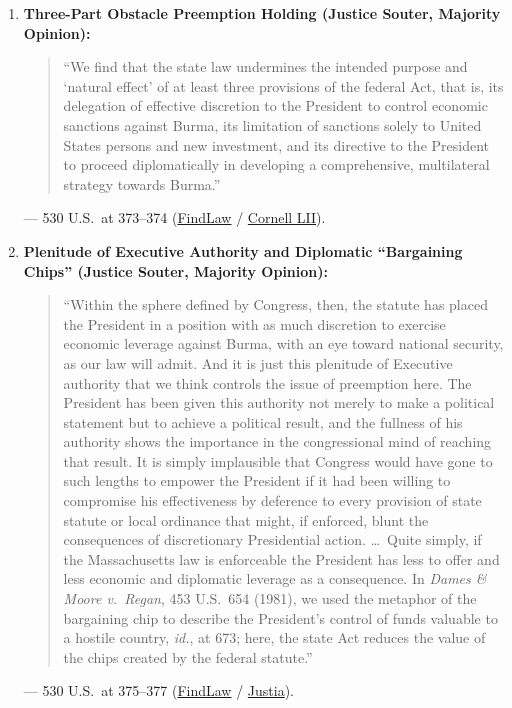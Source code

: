 \documentclass[12pt]{article}
\begin{document}
\begin{enumerate}
    \item \textbf{Three-Part Obstacle Preemption Holding (Justice Souter, Majority Opinion):}
    \begin{quote}
        ``We find that the state law undermines the intended purpose and `natural effect' of at least three provisions of the federal Act, that is, its delegation of effective discretion to the President to control economic sanctions against Burma, its limitation of sanctions solely to United States persons and new investment, and its directive to the President to proceed diplomatically in developing a comprehensive, multilateral strategy towards Burma.''
    \end{quote}
    --- 530 U.S.\ at 373--374 (\href{https://caselaw.findlaw.com/court/us-supreme-court/530/363.html}{FindLaw} / \href{https://www.law.cornell.edu/supct/html/99-474.ZO.html}{Cornell LII}).

    \item \textbf{Plenitude of Executive Authority and Diplomatic ``Bargaining Chips'' (Justice Souter, Majority Opinion):}
    \begin{quote}
        ``Within the sphere defined by Congress, then, the statute has placed the President in a position with as much discretion to exercise economic leverage against Burma, with an eye toward national security, as our law will admit. And it is just this plenitude of Executive authority that we think controls the issue of preemption here. The President has been given this authority not merely to make a political statement but to achieve a political result, and the fullness of his authority shows the importance in the congressional mind of reaching that result. It is simply implausible that Congress would have gone to such lengths to empower the President if it had been willing to compromise his effectiveness by deference to every provision of state statute or local ordinance that might, if enforced, blunt the consequences of discretionary Presidential action. \dots\ Quite simply, if the Massachusetts law is enforceable the President has less to offer and less economic and diplomatic leverage as a consequence. In \textit{Dames \& Moore v.\ Regan}, 453 U.S.\ 654 (1981), we used the metaphor of the bargaining chip to describe the President's control of funds valuable to a hostile country, \textit{id.}, at 673; here, the state Act reduces the value of the chips created by the federal statute.''
    \end{quote}
    --- 530 U.S.\ at 375--377 (\href{https://caselaw.findlaw.com/court/us-supreme-court/530/363.html}{FindLaw} / \href{https://supreme.justia.com/cases/federal/us/530/363/}{Justia}).


\end{enumerate}
\end{document}
